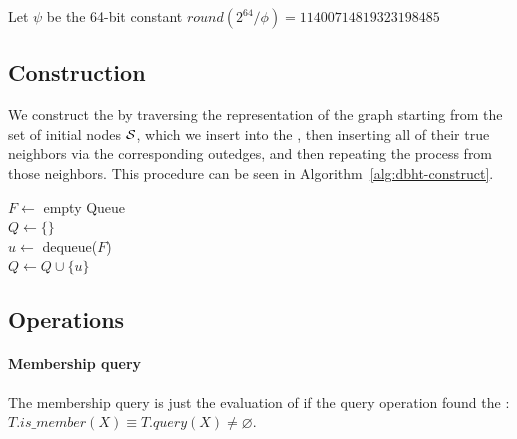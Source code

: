 \begin{algorithm}
  \caption{$\mathit{fingerprint(X)}$}\label{alg:fingerprint}
  Let $\psi$ be the 64-bit constant $\mathit{round}({2^{64}}/{\phi})=11400714819323198485$\\
 
\end{algorithm}

\subsection{\dBHT Construction}
\label{subsubsec:dbht-construction}

We construct the \dBHT by traversing the \dBCM representation of the graph starting from the set of initial nodes $\strsetname{S}$, which we insert into the \dBHT, then inserting all of their true neighbors via the corresponding outedges, and then repeating the process from those neighbors. This procedure can be seen in Algorithm~\ref{alg:dbht-construct}.

\begin{algorithm}
	\caption{$T.\mathit{construct}(C)$}\label{alg:dbht-construct}
  $F \gets$ empty Queue\\
  $Q \gets \{\}$\\
   {
    $u \gets$ dequeue($F$)\\
    $Q \gets Q \cup \{u\}$\\
  }
\end{algorithm}

\subsection{\dBHT Operations}

\paragraph*{Membership query} The membership query is just the evaluation of if the query operation found the \kmer: $T.\mathit{is\_member}(X) \equiv T.\mathit{query}(X) \neq \varnothing$.

